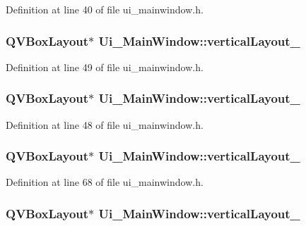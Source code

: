 Definition at line 40 of file ui\-\_\-mainwindow.\-h.

\hypertarget{class_ui___main_window_afcc20a3d5058037a00cdc6122f231848}{
\subsubsection[{vertical\-Layout\-\_\-5}]{\setlength{\rightskip}{0pt plus 5cm}Q\-V\-Box\-Layout$\ast$ Ui\-\_\-\-Main\-Window\-::vertical\-Layout\-\_}}\label{class_ui___main_window_afcc20a3d5058037a00cdc6122f231848}


Definition at line 49 of file ui\-\_\-mainwindow.\-h.

\hypertarget{class_ui___main_window_a93c190b085c63a667c535ba0bbcfec7c}{
\subsubsection[{vertical\-Layout\-\_\-6}]{\setlength{\rightskip}{0pt plus 5cm}Q\-V\-Box\-Layout$\ast$ Ui\-\_\-\-Main\-Window\-::vertical\-Layout\-\_}}\label{class_ui___main_window_a93c190b085c63a667c535ba0bbcfec7c}


Definition at line 48 of file ui\-\_\-mainwindow.\-h.

\hypertarget{class_ui___main_window_a7b66d5d6ab55f3977317359d09a42345}{
\subsubsection[{vertical\-Layout\-\_\-7}]{\setlength{\rightskip}{0pt plus 5cm}Q\-V\-Box\-Layout$\ast$ Ui\-\_\-\-Main\-Window\-::vertical\-Layout\-\_}}\label{class_ui___main_window_a7b66d5d6ab55f3977317359d09a42345}


Definition at line 68 of file ui\-\_\-mainwindow.\-h.

\hypertarget{class_ui___main_window_aaa8cc393d5a44562d629a9f646d2c6dd}{
\subsubsection[{vertical\-Layout\-\_\-8}]{\setlength{\rightskip}{0pt plus 5cm}Q\-V\-Box\-Layout$\ast$ Ui\-\_\-\-Main\-Window\-::vertical\-Layout\-\_}}\label{class_ui___main_window_aaa8cc393d5a44562d629a9f646d2c6dd}


